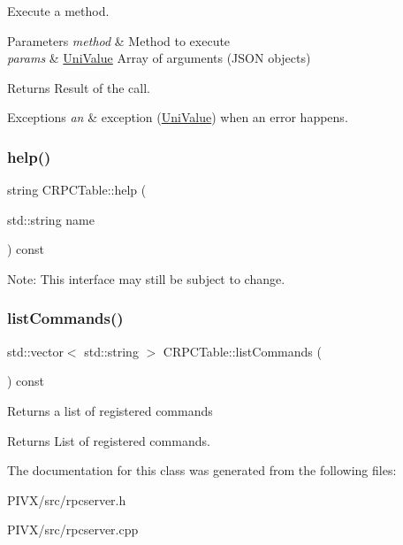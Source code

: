 Execute a method. 
\begin{DoxyParams}{Parameters}
{\em method} & Method to execute \\
\hline
{\em params} & \mbox{\hyperlink{class_uni_value}{Uni\+Value}} Array of arguments (J\+S\+ON objects) \\
\hline
\end{DoxyParams}
\begin{DoxyReturn}{Returns}
Result of the call. 
\end{DoxyReturn}

\begin{DoxyExceptions}{Exceptions}
{\em an} & exception (\mbox{\hyperlink{class_uni_value}{Uni\+Value}}) when an error happens. \\
\hline
\end{DoxyExceptions}
\mbox{\label{class_c_r_p_c_table_aaba3a5908a430d07084292d5a894c812}} 
\subsubsection{\texorpdfstring{help()}{help()}}
{\footnotesize\ttfamily string C\+R\+P\+C\+Table\+::help (\begin{DoxyParamCaption}\item[{std\+::string}]{name }\end{DoxyParamCaption}) const}

Note\+: This interface may still be subject to change. \mbox{\label{class_c_r_p_c_table_a7ebce2fd23e8343e42d36a9bcd02de95}} 
\subsubsection{\texorpdfstring{list\+Commands()}{listCommands()}}
{\footnotesize\ttfamily std\+::vector$<$ std\+::string $>$ C\+R\+P\+C\+Table\+::list\+Commands (\begin{DoxyParamCaption}{ }\end{DoxyParamCaption}) const}

Returns a list of registered commands \begin{DoxyReturn}{Returns}
List of registered commands. 
\end{DoxyReturn}


The documentation for this class was generated from the following files\+:\begin{DoxyCompactItemize}
\item 
P\+I\+V\+X/src/rpcserver.\+h\item 
P\+I\+V\+X/src/rpcserver.\+cpp\end{DoxyCompactItemize}
